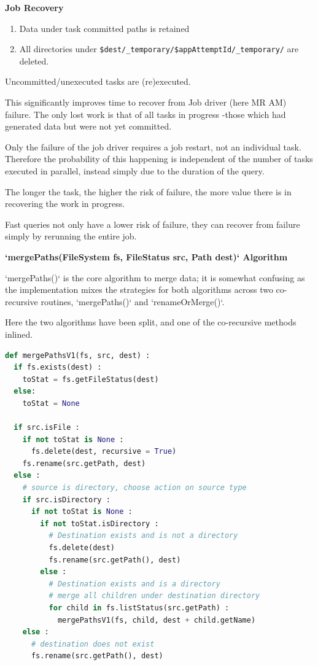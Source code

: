\documentclass[conference]{IEEEtran}
\begin{document}
\textbf{Job Recovery}

\begin{enumerate}

\item Data under task committed paths is retained
\item All directories under \texttt{\$dest/\_temporary/\$appAttemptId/\_temporary/}
are deleted.
\end{enumerate}

Uncommitted/unexecuted tasks are (re)executed.

This significantly improves time to recover from Job driver (here MR AM) failure.
The only lost work is that of all tasks in progress -those which had generated
data but were not yet committed.

Only the failure of the job driver requires a job restart, not an individual
task.
Therefore the probability of this happening is independent of the number
of tasks executed in parallel, instead simply due to the duration of the query.

The longer the task, the higher the risk of failure, the more value there is
in recovering the work in progress.

Fast queries not only have a lower risk of failure, they can recover from
failure simply by rerunning the entire job.

\textbf{`mergePaths(FileSystem fs, FileStatus src, Path dest)` Algorithm}

`mergePaths()` is the core algorithm to merge data;
it is somewhat confusing
as the implementation mixes the strategies for both algorithms across
two co-recursive routines, `mergePaths()` and `renameOrMerge()`.


Here the two algorithms have been split, and one of the co-recursive methods
inlined.

\begin{lstlisting}[language=Python]
def mergePathsV1(fs, src, dest) :
  if fs.exists(dest) :
    toStat = fs.getFileStatus(dest)
  else:
    toStat = None

  if src.isFile :
    if not toStat is None :
      fs.delete(dest, recursive = True)
    fs.rename(src.getPath, dest)
  else :
    # source is directory, choose action on source type
    if src.isDirectory :
      if not toStat is None :
        if not toStat.isDirectory :
          # Destination exists and is not a directory
          fs.delete(dest)
          fs.rename(src.getPath(), dest)
        else :
          # Destination exists and is a directory
          # merge all children under destination directory
          for child in fs.listStatus(src.getPath) :
            mergePathsV1(fs, child, dest + child.getName)
    else :
      # destination does not exist
      fs.rename(src.getPath(), dest)
\end{lstlisting}
\end{document}
